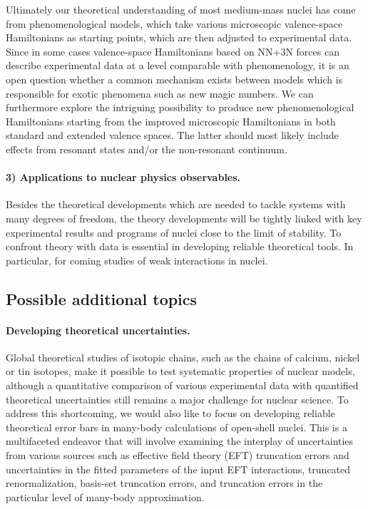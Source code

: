 \documentclass[%
twoside,                 %
final,                   %
10pt]{article}
\begin{document}
Ultimately our theoretical understanding of most medium-mass nuclei has come 
from phenomenological models, which take various microscopic valence-space 
Hamiltonians as starting points, which are then adjusted to experimental data.  Since in some cases valence-space Hamiltonians based on NN+3N forces can describe experimental 
data at a level comparable with phenomenology, it is an open question whether a 
common mechanism exists between models which is responsible for exotic 
phenomena such as new magic numbers.  We can furthermore explore the 
intriguing possibility to produce new phenomenological Hamiltonians starting from 
the improved microscopic Hamiltonians in both standard and 
extended valence spaces. The latter should most likely include effects from resonant states and/or the non-resonant continuum.




\paragraph{3) Applications to nuclear physics observables.}

Besides the theoretical developments which are needed to tackle systems with many degrees of freedom, the theory developments  will be tightly linked with key experimental results and programs of nuclei close to the limit of stability. 
To confront theory with data is essential in developing reliable theoretical tools. In particular, for coming studies 
of weak interactions in nuclei.



\subsection{Possible additional topics}

\paragraph{Developing theoretical uncertainties.}
Global theoretical
studies of isotopic chains, such as the chains of calcium, nickel or
tin isotopes, make it possible to test systematic properties of
nuclear models, although a quantitative
comparison of various experimental data with quantified theoretical
uncertainties still remains a major challenge for nuclear science. To
address this shortcoming, we would also like to 
focus on developing reliable theoretical error bars in many-body
calculations of open-shell nuclei. This is a multifaceted endeavor that will involve examining the interplay of uncertainties from various sources
such as effective field theory (EFT) truncation errors and uncertainties in the
fitted parameters of the input EFT interactions, truncated renormalization, basis-set
truncation errors, and truncation errors in the particular level of
many-body approximation.
\end{document}
